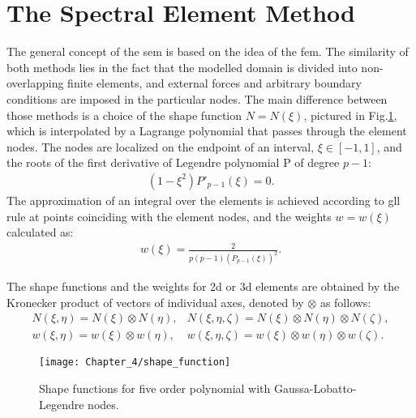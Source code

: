 \section{The Spectral Element Method}
\label{sec:sem}


The general concept of the \ac{sem} is based on the idea of the \ac{fem}.
The similarity of both methods lies in the fact that the modelled domain is divided into non-overlapping finite elements, and external forces and arbitrary boundary conditions are imposed in the particular nodes.
The main difference between those methods is a choice of the shape function \( N=N(\xi )\), pictured in Fig.\ref{fig:shape}, which is interpolated by a Lagrange polynomial that passes through the element nodes.
The nodes are localized on the endpoint of an interval, \(\xi\in[-1,1]\), and the roots of the first derivative of Legendre polynomial P of degree \(p-1\):
\begin{eqnarray}
	(1-\xi^2)P'_{p-1}(\xi)=0.
	\label{eq:nodes}
\end{eqnarray}
The approximation of an integral over the elements is achieved according to \ac{gll} rule at points coinciding with the element nodes, 
and the weights \(w=w(\xi)\) calculated as:
\begin{eqnarray}
	{w(\xi)} = \frac{2}{p(p-1)(P_{p-1}(\xi))^2}.
	\label{eq:weights}
\end{eqnarray}

The shape functions and the weights for \ac{2d} or \ac{3d} elements are obtained by the Kronecker product of vectors of individual axes, denoted by \(\otimes\) as follows:
\begin{eqnarray}
	N(\xi,\eta) = N(\xi)\otimes N(\eta), & N(\xi,\eta,\zeta) = N(\xi)\otimes N(\eta)\otimes N(\zeta), \nonumber\\
	w(\xi,\eta) = w(\xi)\otimes w(\eta), & w(\xi,\eta,\zeta) = w(\xi)\otimes w(\eta)\otimes w(\zeta).
	\label{eq:3Dshape_weights}
\end{eqnarray}
\begin{figure}[H]
	\begin{center}
		\texttt{[image: Chapter\_4/shape\_function]}
	\end{center}
	\caption{Shape functions for five order polynomial with Gaussa-Lobatto-Legendre nodes.}
	\label{fig:shape}
\end{figure}

